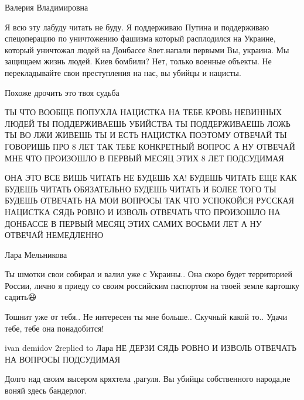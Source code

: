  
 
 
 
 


Валерия Владимировна

Я всю эту лабуду читать не буду. Я поддерживаю Путина и поддерживаю
спецоперацию по уничтожению фашизма который расплодился на Украине, который
уничтожал людей на Донбассе 8лет.напали первыми Вы, украина. Мы защищаем жизнь
людей. Киев бомбили? Нет, только военные объекты. Не перекладывайте свои
преступления на нас, вы убийцы и нацисты.

Похоже дрочить это твоя судьба

ТЫ ЧТО ВООБЩЕ ПОПУХЛА НАЦИСТКА НА ТЕБЕ КРОВЬ НЕВИННЫХ ЛЮДЕЙ ТЫ ПОДДЕРЖИВАЕШЬ
УБИЙСТВА ТЫ ПОДДЕРЖИВАЕШЬ ЛОЖЬ ТЫ ВО ЛЖИ ЖИВЕШЬ ТЫ И ЕСТЬ НАЦИСТКА ПОЭТОМУ
ОТВЕЧАЙ ТЫ ГОВОРИШЬ ПРО 8 ЛЕТ ТАК ТЕБЕ КОНКРЕТНЫЙ ВОПРОС А НУ ОТВЕЧАЙ МНЕ ЧТО
ПРОИЗОШЛО В ПЕРВЫЙ МЕСЯЦ ЭТИХ 8 ЛЕТ ПОДСУДИМАЯ

ОНА ЭТО ВСЕ ВИШЬ ЧИТАТЬ НЕ БУДЕШЬ ХА! БУДЕШЬ ЧИТАТЬ ЕЩЕ КАК БУДЕШЬ ЧИТАТЬ
ОБЯЗАТЕЛЬНО БУДЕШЬ ЧИТАТЬ И БОЛЕЕ ТОГО ТЫ БУДЕШЬ ОТВЕЧАТЬ НА МОИ ВОПРОСЫ ТАК
ЧТО УСПОКОЙСЯ РУССКАЯ НАЦИСТКА СЯДЬ РОВНО И ИЗВОЛЬ ОТВЕЧАТЬ ЧТО ПРОИЗОШЛО НА
ДОНБАССЕ В ПЕРВЫЙ МЕСЯЦ ЭТИХ САМИХ ВОСЬМИ ЛЕТ А НУ ОТВЕЧАЙ НЕМЕДЛЕННО

Лара Мельникова

Ты шмотки свои собирал и валил уже с Украины.. Она скоро будет территорией России, лично я приеду со своим российским паспортом на твоей земле картошку садить😃

Тошнит уже от тебя.. Не интересен ты мне больше.. Скучный какой то.. Удачи тебе, тебе она понадобится!

ivan demidov 2replied to Лара
НЕ ДЕРЗИ СЯДЬ РОВНО И ИЗВОЛЬ ОТВЕЧАТЬ НА ВОПРОСЫ ПОДСУДИМАЯ


Долго над своим высером кряхтела ,рагуля. Вы убийцы собственного народа,не воняй здесь бандерлог.

